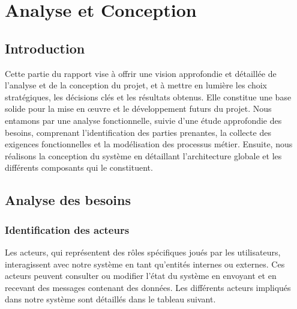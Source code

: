 \chapter{Analyse et Conception}
\label{chap:Analysis and Design}
\section*{Introduction}

\hspace{\parindent}Cette partie du rapport vise à offrir une vision approfondie et détaillée de l'analyse et de la conception du projet, et à mettre en lumière les choix stratégiques, les décisions clés et les résultats obtenus. Elle constitue une base solide pour la mise en œuvre et le développement futurs du projet. Nous entamons par une analyse fonctionnelle, suivie d'une étude approfondie des besoins, comprenant l'identification des parties prenantes, la collecte des exigences fonctionnelles et la modélisation des processus métier. Ensuite, nous réalisons la conception du système en détaillant l'architecture globale et les différents composants qui le constituent.
\pagebreak







\section{Analyse des besoins}
\subsection{Identification des acteurs}

\hspace{\parindent}Les acteurs, qui représentent des rôles spécifiques joués par les utilisateurs, interagissent avec notre système en tant qu'entités internes ou externes. Ces acteurs peuvent consulter ou modifier l'état du système en envoyant et en recevant des messages contenant des données. Les différents acteurs impliqués dans notre système sont détaillés dans le tableau suivant.


